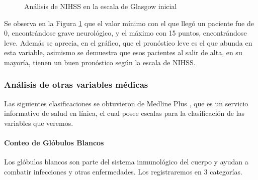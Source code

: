\begin{center}
    	\begin{figure}[H]
	\centering
	\caption{Análisis de NIHSS en la escala de Glasgow inicial}
	\label{fig:aNISSG}
	\end{figure}
\end{center}
    
    Se observa en la Figura \ref{fig:aNISSG} que el valor mínimo con el que llegó un paciente fue de 0, encontrándose grave neurológico, y el máximo con 15 puntos, encontrándose leve. Además se aprecia, en el gráfico, que el pronóstico leve es el que abunda en esta variable, asimismo se demuestra que esos pacientes al salir de alta, en su mayoría, tienen un buen pronóstico según la escala de NIHSS.

    \hypertarget{anuxe1lisis-de-otas-variables-de-muxe9dicas}{%
\subsubsection{Análisis de otras variables médicas}\label{anuxe1lisis-de-otas-variables-de-muxe9dicas}}

Las siguientes clasificaciones se obtuvieron de Medline Plus \cite{med}, que es un servicio informativo de salud en líniea, el cual posee escalas para la clasificación de las variables que veremos.

    \hypertarget{conteo-de-gluxf3bulos-blancos}{%
\paragraph{Conteo de Glóbulos
Blancos}\label{conteo-de-gluxf3bulos-blancos}}

Los glóbulos blancos son parte del sistema inmunológico del cuerpo y
ayudan a combatir infecciones y otras enfermedades. Los registraremos en
3 categorías.

